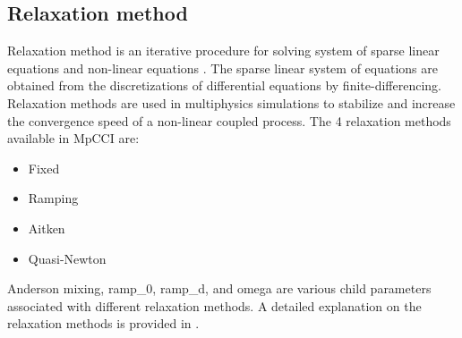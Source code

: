 \subsection{Relaxation method}

Relaxation method is an iterative procedure for solving system of sparse linear equations and non-linear equations \cite{relaxationmethod_intro}. The sparse linear system of equations are obtained from the discretizations of differential equations by finite-differencing. Relaxation methods are used in multiphysics simulations to stabilize and increase the convergence speed of a non-linear coupled process. The 4 relaxation methods available in MpCCI are:

\begin{itemize}
    \item Fixed
    \item Ramping
    \item Aitken
    \item Quasi-Newton
\end{itemize}

Anderson mixing, ramp\_0, ramp\_d, and omega are various child parameters associated with different relaxation methods. A detailed explanation on the relaxation methods is provided in \cite{MpCCI_documentation}. 




